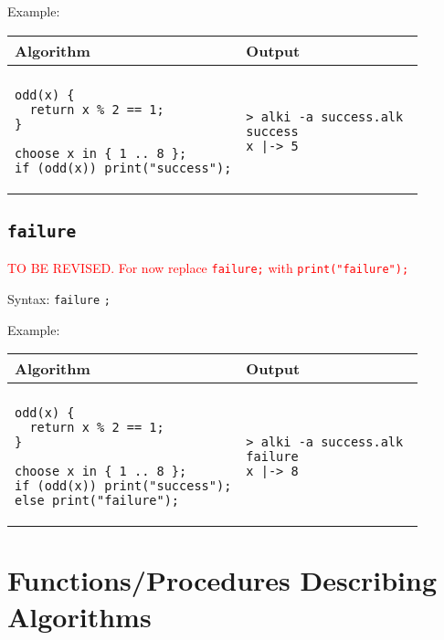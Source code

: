 \documentclass[a4paper]{report}
\begin{document}
Example:
\begin{center}
\begin{tabular}{ll}
Algorithm & Output\\
\hline
\\
\begin{minipage}{.45\textwidth}
\begin{verbatim}
odd(x) {
  return x % 2 == 1;
}

choose x in { 1 .. 8 };
if (odd(x)) print("success");
\end{verbatim}
\end{minipage}
&
\begin{minipage}{.45\textwidth}
\begin{verbatim}
> alki -a success.alk 
success
x |-> 5
\end{verbatim}
\end{minipage}
\end{tabular}
\end{center}

\subsection{\texttt{failure}}

\textcolor{red}{TO BE REVISED. For now replace \texttt{failure;} with \texttt{print("failure");}}

Syntax: \verb"failure" \verb";"

Example:
\begin{center}
\begin{tabular}{ll}
Algorithm & Output\\
\hline
\\
\begin{minipage}{.45\textwidth}
\begin{verbatim}
odd(x) {
  return x % 2 == 1;
}

choose x in { 1 .. 8 };
if (odd(x)) print("success");
else print("failure");
\end{verbatim}
\end{minipage}
&
\begin{minipage}{.45\textwidth}
\begin{verbatim}
> alki -a success.alk 
failure
x |-> 8
\end{verbatim}
\end{minipage}
\end{tabular}
\end{center}

\section{Functions/Procedures Describing Algorithms}
\end{document}
